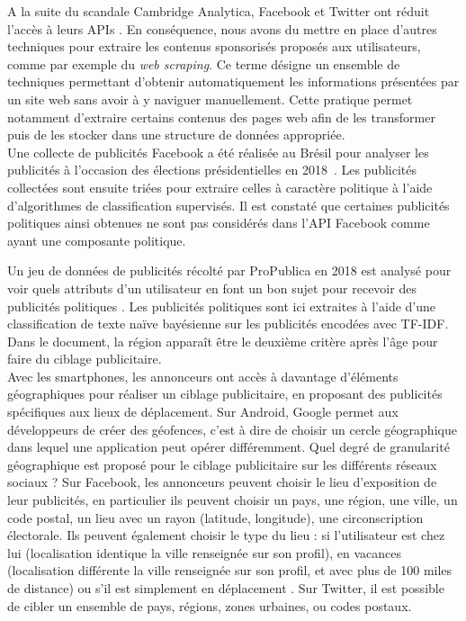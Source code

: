 \documentclass[runningheads]{llncs}
\begin{document}
A la suite du scandale Cambridge Analytica, Facebook et Twitter ont réduit l'accès à leurs APIs \cite{axel_bruns_after_2019}. En conséquence, nous avons du mettre en place d'autres techniques pour extraire les contenus sponsorisés proposés aux utilisateurs, comme par exemple du \textit{web scraping}. Ce terme désigne un ensemble de techniques permettant d'obtenir automatiquement les informations présentées par un site web sans avoir à y naviguer manuellement. Cette pratique permet notamment d'extraire certains contenus des pages web afin de les transformer puis de les stocker dans une structure de données appropriée. \\

Une collecte de publicités Facebook a été réalisée au Brésil pour analyser les publicités à l'occasion des élections présidentielles en 2018~\cite{silva_facebook_2020}. Les publicités collectées sont ensuite triées pour extraire celles à caractère politique à l'aide d'algorithmes de classification supervisés. Il est constaté que certaines publicités politiques ainsi obtenues ne sont pas considérés dans l'API Facebook comme ayant une composante politique. %


Un jeu de données de publicités récolté par ProPublica en 2018 est analysé pour voir quels attributs d'un utilisateur en font un bon sujet pour recevoir des publicités politiques \cite{levi_automatically_2020}. Les publicités politiques sont ici extraites à l'aide d'une classification de texte naïve bayésienne sur les publicités encodées avec TF-IDF. Dans le document, la région apparaît être le deuxième critère après l'âge pour faire du ciblage publicitaire. \\


Avec les smartphones, les annonceurs ont accès à davantage  d'éléments géographiques pour réaliser un ciblage publicitaire, en proposant des publicités spécifiques aux lieux de déplacement. Sur Android, Google permet aux développeurs de créer des géofences, c'est à dire de choisir un cercle géographique dans lequel une application peut opérer différemment. Quel degré de granularité géographique est proposé pour le ciblage publicitaire sur les différents réseaux sociaux ? Sur Facebook, les annonceurs peuvent choisir le lieu d'exposition de leur publicités, en particulier ils peuvent choisir un pays, une région, une ville, un code postal, un lieu avec un rayon (latitude, longitude), une circonscription électorale. Ils peuvent également choisir le type du lieu : si l'utilisateur est chez lui (localisation identique la ville renseignée sur son profil), en vacances (localisation différente la ville renseignée sur son profil, et avec plus de 100 miles de distance) ou s'il est simplement en déplacement \cite{noauthor_ciblage_nodate}. Sur Twitter, il est possible de cibler un ensemble de pays, régions, zones urbaines, ou codes postaux. 
\end{document}
